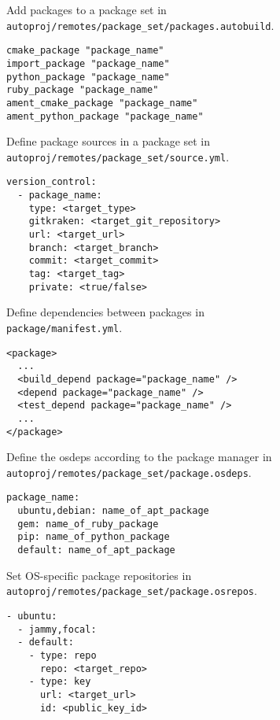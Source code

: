 \documentclass[9pt]{innovativeinnovation-cheatsheet}
\begin{document}
\begin{multicols*}{3}

Add packages to a package set in \\
\verb|autoproj/remotes/package_set/packages.autobuild|.

\begin{lstlisting}
cmake_package "package_name"
import_package "package_name"
python_package "package_name"
ruby_package "package_name"
ament_cmake_package "package_name"
ament_python_package "package_name"
\end{lstlisting}

Define package sources in a package set in \\
\verb|autoproj/remotes/package_set/source.yml|.

\begin{lstlisting}
version_control:
  - package_name:
    type: <target_type>
    gitkraken: <target_git_repository>
    url: <target_url>
    branch: <target_branch>
    commit: <target_commit>
    tag: <target_tag>
    private: <true/false>
\end{lstlisting}

Define dependencies between packages in \\
\verb|package/manifest.yml|.

\begin{lstlisting}
<package>
  ...
  <build_depend package="package_name" />
  <depend package="package_name" />
  <test_depend package="package_name" />
  ...
</package>
\end{lstlisting}


Define the osdeps according to the package manager in \\
\verb|autoproj/remotes/package_set/package.osdeps|.

\begin{lstlisting}
package_name:
  ubuntu,debian: name_of_apt_package
  gem: name_of_ruby_package
  pip: name_of_python_package
  default: name_of_apt_package
\end{lstlisting}


Set OS-specific package repositories  in \\
\verb|autoproj/remotes/package_set/package.osrepos|.

\begin{lstlisting}
- ubuntu:
  - jammy,focal:
  - default:
    - type: repo
      repo: <target_repo>
    - type: key
      url: <target_url>
      id: <public_key_id>
\end{lstlisting}


\end{multicols*}
\end{document}
